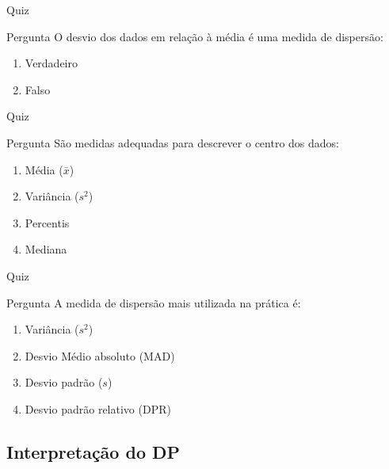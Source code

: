 \documentclass{beamer}
\begin{document}
\begin{frame}{\scriptsize Quiz}
  \begin{block}{Pergunta}
    \footnotesize
    O desvio dos dados em relação à média é uma medida de dispersão:

    \bigskip
    \begin{enumerate}
      \scriptsize
    \item Verdadeiro
    \item \alert<2>{Falso}
    \end{enumerate}
  \end{block}
\end{frame}

\begin{frame}{\scriptsize Quiz}
  \begin{block}{Pergunta}
    \footnotesize
    São medidas adequadas para descrever o centro dos dados:

    \bigskip
    \begin{enumerate}
      \scriptsize
    \item \alert<2>{Média ($\bar{x}$)}
    \item Variância ($s^2$)
    \item Percentis
    \item \alert<2>{Mediana}
    \end{enumerate}
  \end{block}
\end{frame}

\begin{frame}{\scriptsize Quiz}
  \begin{block}{Pergunta}
    \footnotesize
    A medida de dispersão mais utilizada na prática é:

    \bigskip
    \begin{enumerate}
      \scriptsize
    \item Variância ($s^2$)
    \item Desvio Médio absoluto (MAD)
    \item \alert<2>{Desvio padrão ($s$)}
    \item Desvio padrão relativo (DPR)
    \end{enumerate}
  \end{block}
\end{frame}

\subsection{Interpretação do DP}
\end{document}

